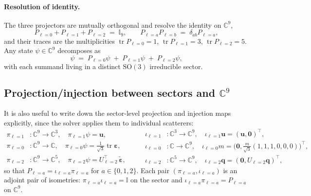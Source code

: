 \documentclass[11pt,a4paper]{article}
\newcommand{\eps}{\varepsilon}
\newcommand{\uu}{\bm{u}}
\newcommand{\tr}{\operatorname{tr}}
\theoremstyle{plain}
\theoremstyle{definition}
\theoremstyle{remark}
\begin{document}
\paragraph{Resolution of identity.}
The three projectors are mutually orthogonal and resolve the identity
on $\mathbb{C}^9$,
\begin{equation}
  P_{\ell=0} + P_{\ell=1} + P_{\ell=2} \;=\; \mathbb{I}_9,
  \qquad
  P_{\ell=a}P_{\ell=b} \;=\; \delta_{ab}P_{\ell=a},
  \label{eq:resolution}
\end{equation}
and their traces are the multiplicities
$\operatorname{tr}P_{\ell=0}=1$,
$\operatorname{tr}P_{\ell=1}=3$, $\operatorname{tr}P_{\ell=2}=5$.
Any state $\psi\in\mathbb{C}^9$ decomposes as
\begin{equation}
  \psi
  \;=\;
  P_{\ell=0}\psi \;+\; P_{\ell=1}\psi \;+\; P_{\ell=2}\psi,
  \label{eq:psi-decomp}
\end{equation}
with each summand living in a distinct $\mathrm{SO}(3)$ irreducible
sector.

\subsection{Projection/injection between sectors and $\mathbb{C}^9$}

It is also useful to write down the sector-level projection
and injection maps explicitly, since the solver applies them to
individual scatterers:
\begin{equation}
\begin{aligned}
  \pi_{\ell=1}&: \mathbb{C}^9 \to \mathbb{C}^3,\quad
  \pi_{\ell=1}\psi = \uu,\\
  \pi_{\ell=0}&: \mathbb{C}^9 \to \mathbb{C},\quad
  \pi_{\ell=0}\psi = \tfrac{1}{\sqrt{3}}\tr\bm{\eps},\\
  \pi_{\ell=2}&: \mathbb{C}^9 \to \mathbb{C}^5,\quad
  \pi_{\ell=2}\psi = U_{\ell=2}^{\!\top}\,\tilde{\bm{\eps}},
\end{aligned}
\qquad
\begin{aligned}
  \iota_{\ell=1}&: \mathbb{C}^3 \to \mathbb{C}^9,\quad
  \iota_{\ell=1}\uu = (\uu,\bm{0})^\top,\\
  \iota_{\ell=0}&: \mathbb{C} \to \mathbb{C}^9,\quad
  \iota_{\ell=0}m  = \bigl(\bm{0},\tfrac{m}{\sqrt{3}}(1,1,1,0,0,0)\bigr)^\top,\\
  \iota_{\ell=2}&: \mathbb{C}^5 \to \mathbb{C}^9,\quad
  \iota_{\ell=2}\bm{q} = (\bm{0},U_{\ell=2}\bm{q})^\top,
\end{aligned}
\end{equation}
so that $P_{\ell=a}=\iota_{\ell=a}\pi_{\ell=a}$ for $a\in\{0,1,2\}$.
Each pair $(\pi_{\ell=a},\iota_{\ell=a})$ is an adjoint pair of
isometries: $\pi_{\ell=a}\iota_{\ell=a}=\mathbb{I}$ on the sector and
$\iota_{\ell=a}\pi_{\ell=a}=P_{\ell=a}$ on $\mathbb{C}^9$.
\end{document}
